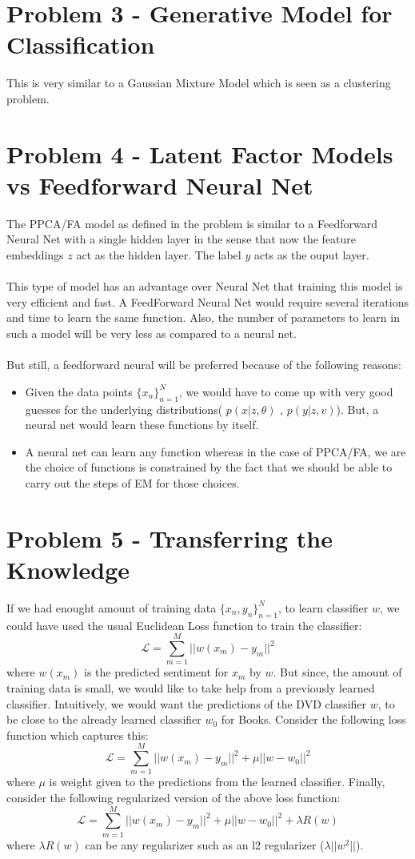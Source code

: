 \documentclass{article}
\begin{document}
\section{Problem 3 - Generative Model for Classification}
This is very similar to a Gaussian Mixture Model which is seen as a clustering problem. 

\section{Problem 4 - Latent Factor Models vs Feedforward Neural Net}
The PPCA/FA model as defined in the problem is similar to a Feedforward Neural Net with a single hidden layer in the sense that now the feature embeddings $z$ act as the hidden layer. The label $y$ acts as the ouput layer. \\ \\
This type of model has an advantage over Neural Net that training this model is very efficient and fast. A FeedForward Neural Net would require several iterations and time to learn the same function. Also, the number of parameters to learn in such a model will be very less as compared to a neural net.\\ \\
But still, a feedforward neural will be preferred because of the following reasons:
\begin{itemize}
\item Given the data points $\{x_n\}_{n=1}^N$, we would have to come up with very good guesses for the underlying distributions( $p(x|z,\theta)$ , $p(y|z,v)$). But, a neural net would learn these functions by itself.
\item A neural net can learn any function whereas in the case of PPCA/FA, we are the choice of functions is constrained by the fact that we should be able to carry out the steps of EM for those choices.
\end{itemize}

\section{Problem 5 - Transferring the Knowledge}
If we had enought amount of training data $\{x_n,y_n\}_{n=1}^N$, to learn classifier $w$, we could have used the usual Euclidean Loss function to train the classifier:
$$\mathcal{L} = \sum_{m=1}^M ||w(x_m)-y_m||^2$$
where $w(x_m)$ is the predicted sentiment for $x_m$ by $w$. But since, the amount of training data is small, we would like to take help from a previously learned classifier. Intuitively, we would want the predictions of the DVD classifier $w$, to be close to the already learned classifier $w_0$ for Books. Consider the following loss function which captures this:
$$\mathcal{L} = \sum_{m=1}^M ||w(x_m)-y_m||^2 + \mu||w-w_0||^2 $$ 
where $\mu$ is weight given to the predictions from the learned classifier. Finally, consider the following regularized version of the above loss function:
$$\mathcal{L} = \sum_{m=1}^M ||w(x_m)-y_m||^2 + \mu||w-w_0||^2 + \lambda R(w)$$ 
where $\lambda R(w)$ can be any regularizer such as an l2 regularizer ($\lambda||w^2||$).
\end{document}
